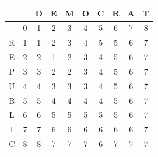 \begin{table}
	\begin{center}
		\begin{tabular}[c]{c|c|c|c|c|c|c|c|c|c|}
			  &                      & D                    & E                    & M                    & O                    & C                    & R                    & A                    & T                    \\\hline
			  & \cellcolor{blue!25}0 & 1                    & 2                    & 3                    & 4                    & 5                    & 6                    & 7                    & 8                    \\\hline
			R & 1                    & \cellcolor{blue!25}1 & 2                    & 3                    & 4                    & 5                    & 5                    & 6                    & 7                    \\\hline
			E & 2                    & 2                    & \cellcolor{blue!25}1 & 2                    & 3                    & 4                    & 5                    & 6                    & 7                    \\\hline
			P & 3                    & 3                    & \cellcolor{blue!25}2 & 2                    & 3                    & 4                    & 5                    & 6                    & 7                    \\\hline
			U & 4                    & 4                    & \cellcolor{blue!25}3 & 3                    & 3                    & 4                    & 5                    & 6                    & 7                    \\\hline
			B & 5                    & 5                    & 4                    & \cellcolor{blue!25}4 & 4                    & 4                    & 5                    & 6                    & 7                    \\\hline
			L & 6                    & 6                    & 5                    & 5                    & \cellcolor{blue!25}5 & 5                    & 5                    & 6                    & 7                    \\\hline
			I & 7                    & 7                    & 6                    & 6                    & 6                    & \cellcolor{blue!25}6 & 6                    & 6                    & 7                    \\\hline
			C & 8                    & 8                    & 7                    & 7                    & 7                    & 6                    & \cellcolor{blue!25}7 & 7                    & 7                    \\\hline

\end{tabular}
\end{center}
\end{table}
